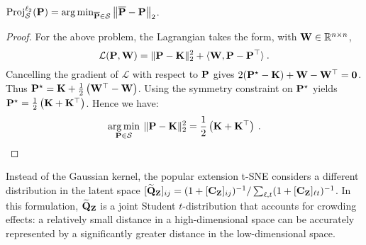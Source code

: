 \begin{proposition}
    $\operatorname{Proj}^{\ell_2}_{\mathcal{S}}(\mathbf{P}) = \operatorname*{arg\,min}_{\overline{\mathbf{P}} \in \mathcal{S}} \big\| \overline{\mathbf{P}} - \mathbf{P} \big\|_2$. 
\end{proposition}

\begin{proof}
For the above problem, the Lagrangian takes the form, with $\mathbf{W} \in \mathbb{R}^{n \times n}$,
\begin{equation}
\mathcal{L}(\mathbf{P}, \mathbf{W}) = \| \mathbf{P} - \mathbf{K} \|_2^2 +\langle \mathbf{W}, \mathbf{P} -\mathbf{P}^{\top} \rangle \:.
\end{equation}
Cancelling the gradient of $\mathcal{L}$ with respect to $\mathbf{P}$ gives $2(\mathbf{P}^\star - \mathbf{K}) + \mathbf{W} - \mathbf{W}^\top = \bm{0}$. Thus $\mathbf{P}^\star = \mathbf{K} + \frac{1}{2} \left(\mathbf{W}^\top - \mathbf{W} \right)$. Using the symmetry constraint on $\mathbf{P}^\star$ yields $\mathbf{P}^\star = \frac{1}{2} \left(\mathbf{K} + \mathbf{K}^\top \right)$.
Hence we have:
\begin{equation}
\operatorname*{arg\,min}_{\mathbf{P} \in \mathcal{S}} \: \| \mathbf{P} -  \mathbf{K} \|_2^2 = \frac{1}{2} \left(\mathbf{K} + \mathbf{K}^\top \right) \:.
\end{equation}
\end{proof}


Instead of the Gaussian kernel, the popular extension t-SNE \citep{van2008visualizing} considers a different distribution in the latent space $[\widetilde{\mathbf{Q}}_{\mathbf{Z}}]_{ij} = (1 + [\mathbf{C}_{\mathbf{Z}}]_{ij})^{-1}/\sum_{\ell,t}(1 +
[\mathbf{C}_{\mathbf{Z}}]_{\ell t})^{-1}$. In this formulation, $\widetilde{\mathbf{Q}}_{\mathbf{Z}}$ is a joint
Student $t$-distribution that accounts for crowding effects: a relatively small
distance in a high-dimensional space can be accurately represented by a
significantly greater distance in the low-dimensional space.  